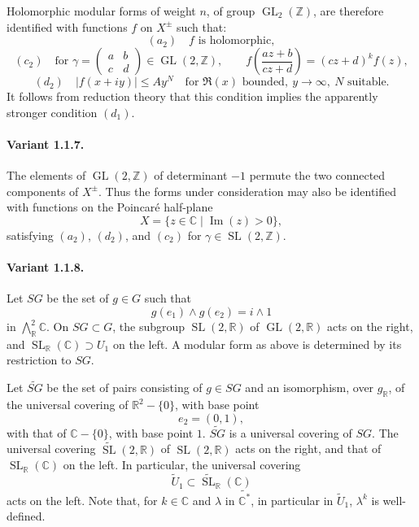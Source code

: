 \documentclass[10pt,a4paper]{article}
\providecommand{\GL}{\operatorname{GL}}
\providecommand{\SL}{\operatorname{SL}}
\providecommand{\R}{\mathbb R}
\providecommand{\Z}{\mathbb Z}
\providecommand{\C}{\mathbb C}
\begin{document}
Holomorphic modular forms of weight \(n\), of group \(\GL_2(\Z)\), are therefore identified with functions \(f\) on \(X^\pm\) such that:
\[
(a_2)\quad f\text{ is holomorphic},
\]
\[
(c_2)\quad
\text{for }\gamma=\begin{pmatrix}a&b\\ c&d\end{pmatrix}\in\GL(2,\Z),\qquad
f\!\left(\frac{az+b}{cz+d}\right)=(cz+d)^k f(z),
\]
\[
(d_2)\quad
|f(x+iy)|\le Ay^N
\quad\text{for }\Re(x)\text{ bounded},\ y\to\infty,\ N\text{ suitable}.
\]
It follows from reduction theory that this condition implies the apparently stronger condition \((d_1)\).

\paragraph{Variant 1.1.7.} The elements of \(\GL(2,\Z)\) of determinant \(-1\) permute the two connected components of \(X^\pm\). Thus the forms under consideration may also be identified with functions on the Poincaré half-plane
\[
X=\{z\in\C\mid \operatorname{Im}(z)>0\},
\]
satisfying \((a_2)\), \((d_2)\), and \((c_2)\) for \(\gamma\in\SL(2,\Z)\).

\paragraph{Variant 1.1.8.} Let \(SG\) be the set of \(g\in G\) such that
\[
g(e_1)\wedge g(e_2)=i\wedge1
\]
in \(\bigwedge^2_{\R}\C\). On \(SG\subset G\), the subgroup \(\SL(2,\R)\) of \(\GL(2,\R)\) acts on the right, and \(\SL_{\R}(\C)\supset U_1\) on the left. A modular form as above is determined by its restriction to \(SG\).

\clearpage
{}
\hypertarget{authority-15}{}
Let \(\widetilde{SG}\) be the set of pairs consisting of \(g\in SG\) and an isomorphism, over \(g_{\R}\), of the universal covering of \(\R^2-\{0\}\), with base point
\[
e_2=(0,1),
\]
with that of \(\C-\{0\}\), with base point \(1\). \(\widetilde{SG}\) is a universal covering of \(SG\). The universal covering \(\widetilde{\SL}(2,\R)\) of \(\SL(2,\R)\) acts on the right, and that of \(\SL_{\R}(\C)\) on the left. In particular, the universal covering
\[
\widetilde U_1\subset\widetilde{\SL}_{\R}(\C)
\]
acts on the left. Note that, for \(k\in\C\) and \(\lambda\) in \(\widetilde{\C^*}\), in particular in \(\widetilde U_1\), \(\lambda^k\) is well-defined.
\end{document}
